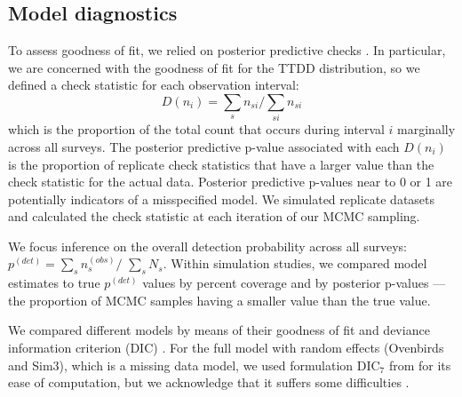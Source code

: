 \documentclass[useAMS,usenatbib,referee,12pt]{article}
\begin{document}



\subsection{Model diagnostics}



To assess goodness of fit, we relied on posterior predictive checks \citep{Gelman1996}.  
In particular, we are concerned with the goodness of fit for the TTDD distribution, so we defined a check statistic for each observation interval:
\[D(n_i) = \sum\limits_{s} n_{si} \big/ \sum\limits_{si} n_{si}\]
which is the proportion of the total count that occurs during interval $i$ marginally across all surveys.  
The posterior predictive p-value associated with each $D(n_i)$ is the proportion of replicate check statistics that have a larger value than the check statistic for the actual data.  
Posterior predictive p-values near to 0 or 1 are potentially indicators of a misspecified model.
We simulated replicate datasets and calculated the check statistic at each iteration of our MCMC sampling.  

We focus inference on the overall detection probability across all surveys: $p^{(det)} = \sum\limits_{s}n_{s}^{(obs)}\big/$ $\sum\limits_{s}N_{s}$.  
Within simulation studies, we compared model estimates to true $p^{(det)}$ values by percent coverage and by posterior p-values --- the proportion of MCMC samples having a smaller value than the true value.  

We compared different models by means of their goodness of fit and deviance information criterion (DIC) \citep{Spiegelhalter2002}.  
For the full model with random effects (Ovenbirds and Sim3), which is a missing data model, we used formulation DIC$_7$ from \citet{Celeux2006} for its ease of computation, but we acknowledge that it suffers some difficulties \citep{Celeux2006, Li2014}.
\end{document}
